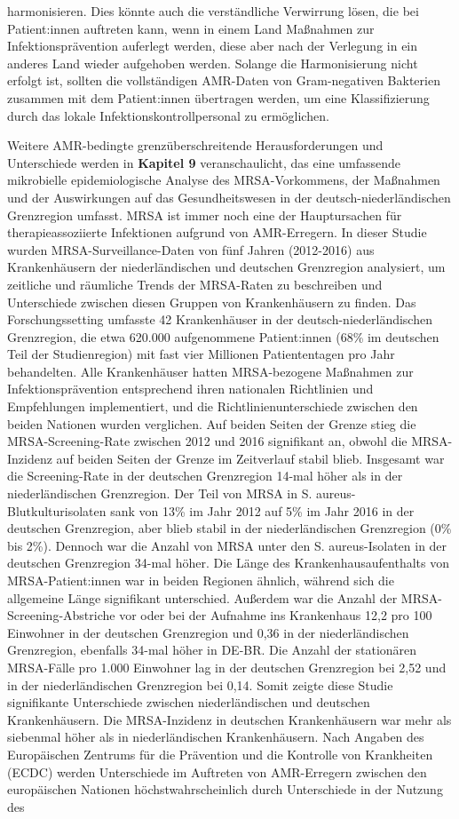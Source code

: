 \documentclass[
]{book}
\begin{document}
harmonisieren. Dies könnte auch die verständliche Verwirrung lösen, die bei Patient:innen auftreten kann, wenn in einem Land Maßnahmen zur Infektionsprävention auferlegt werden, diese aber nach der Verlegung in ein anderes Land wieder aufgehoben werden. Solange die Harmonisierung nicht erfolgt ist, sollten die vollständigen AMR-Daten von Gram-negativen Bakterien zusammen mit dem Patient:innen übertragen werden, um eine Klassifizierung durch das lokale Infektionskontrollpersonal zu ermöglichen.

Weitere AMR-bedingte grenzüberschreitende Herausforderungen und Unterschiede werden in \textbf{Kapitel 9} veranschaulicht, das eine umfassende mikrobielle epidemiologische Analyse des MRSA-Vorkommens, der Maßnahmen und der Auswirkungen auf das Gesundheitswesen in der deutsch-niederländischen Grenzregion umfasst. MRSA ist immer noch eine der Hauptursachen für therapieassoziierte Infektionen aufgrund von AMR-Erregern. In dieser Studie wurden MRSA-Surveillance-Daten von fünf Jahren (2012-2016) aus Krankenhäusern der niederländischen und deutschen Grenzregion analysiert, um zeitliche und räumliche Trends der MRSA-Raten zu beschreiben und Unterschiede zwischen diesen Gruppen von Krankenhäusern zu finden. Das Forschungssetting umfasste 42 Krankenhäuser in der deutsch-niederländischen Grenzregion, die etwa 620.000 aufgenommene Patient:innen (68\% im deutschen Teil der Studienregion) mit fast vier Millionen Patiententagen pro Jahr behandelten. Alle Krankenhäuser hatten MRSA-bezogene Maßnahmen zur Infektionsprävention entsprechend ihren nationalen Richtlinien und Empfehlungen implementiert, und die Richtlinienunterschiede zwischen den beiden Nationen wurden verglichen. Auf beiden Seiten der Grenze stieg die MRSA-Screening-Rate zwischen 2012 und 2016 signifikant an, obwohl die MRSA-Inzidenz auf beiden Seiten der Grenze im Zeitverlauf stabil blieb. Insgesamt war die Screening-Rate in der deutschen Grenzregion 14-mal höher als in der niederländischen Grenzregion. Der Teil von MRSA in S. aureus-Blutkulturisolaten sank von 13\% im Jahr 2012 auf 5\% im Jahr 2016 in der deutschen Grenzregion, aber blieb stabil in der niederländischen Grenzregion (0\% bis 2\%). Dennoch war die Anzahl von MRSA unter den S. aureus-Isolaten in der deutschen Grenzregion 34-mal höher. Die Länge des Krankenhausaufenthalts von MRSA-Patient:innen war in beiden Regionen ähnlich, während sich die allgemeine Länge signifikant unterschied. Außerdem war die Anzahl der MRSA-Screening-Abstriche vor oder bei der Aufnahme ins Krankenhaus 12,2 pro 100 Einwohner in der deutschen Grenzregion und 0,36 in der niederländischen Grenzregion, ebenfalls 34-mal höher in DE-BR. Die Anzahl der stationären MRSA-Fälle pro 1.000 Einwohner lag in der deutschen Grenzregion bei 2,52 und in der niederländischen Grenzregion bei 0,14. Somit zeigte diese Studie signifikante Unterschiede zwischen niederländischen und deutschen Krankenhäusern. Die MRSA-Inzidenz in deutschen Krankenhäusern war mehr als siebenmal höher als in niederländischen Krankenhäusern. Nach Angaben des Europäischen Zentrums für die Prävention und die Kontrolle von Krankheiten (ECDC) werden Unterschiede im Auftreten von AMR-Erregern zwischen den europäischen Nationen höchstwahrscheinlich durch Unterschiede in der Nutzung des 
\end{document}
